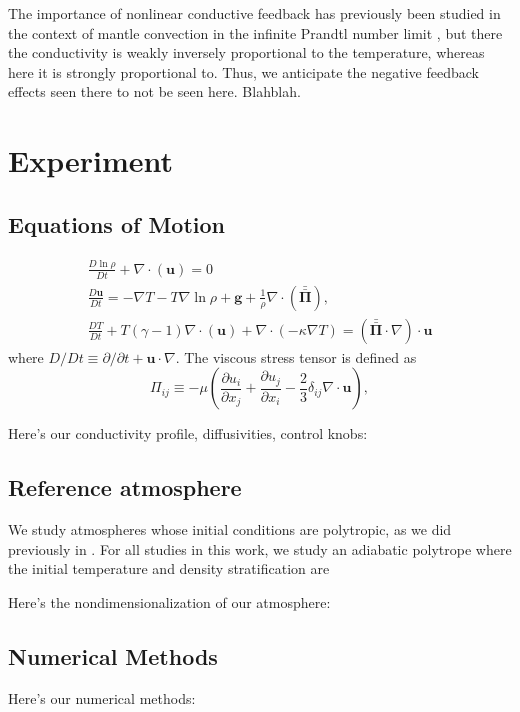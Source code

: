 \documentclass[twocolumn, amsmath, amsfonts, amssymb]{aastex62}
\newcommand{\Div}[1]{\ensuremath{\nabla\cdot\left( #1\right)}}
\newcommand{\grad}{\ensuremath{\nabla}}
\newcommand{\stressT}{\ensuremath{\bm{\bar{\bar{\Pi}}}}}
\begin{document}
The importance of nonlinear conductive feedback has previously been studied in
the context of mantle convection in the infinite Prandtl number limit
\citep{dubuffet&all2000}, but there the conductivity is weakly inversely proportional
to the temperature, whereas here it is strongly proportional to. Thus, we anticipate
the negative feedback effects seen there to not be seen here. Blahblah.





\section{Experiment} \label{sec:experiment}
\subsection{Equations of Motion}
\begin{gather}
\frac{D \ln\rho}{D t} + \Div{\bm{u}} = 0
	\label{eqn:density_equation}
\\
\frac{D \bm{u}}{D t}  =
-\grad T - T \grad\ln\rho + \bm{g} + \frac{1}{\rho}\Div{\stressT}, 
	\label{eqn:momentum_equation}
\\
\frac{D T}{D t} + T(\gamma - 1)\Div{\bm{u}}
+ \Div{-\kappa \grad T} = (\stressT\cdot\grad)\cdot\bm{u}
	\label{eqn:energy_equation}
\end{gather}
where $D/Dt \equiv \partial/\partial t + \bm{u}\cdot\grad$. The
viscous stress tensor is defined as 
\begin{equation}
\Pi_{ij} \equiv -\mu \left(\frac{\partial u_i}{\partial x_j} + 
\frac{\partial u_j}{\partial x_i} - \frac{2}{3}\delta_{ij}\grad\cdot\bm{u}\right),
	\label{eqn:stress_tensor}
\end{equation}


Here's our conductivity profile, diffusivities, control knobs:

\subsection{Reference atmosphere}
We study atmospheres whose initial conditions are polytropic,
as we did previously in \cite{anders&brown2017}. For all studies
in this work, we study an adiabatic polytrope where the initial
temperature and density stratification are


Here's the nondimensionalization of our atmosphere:


\subsection{Numerical Methods}
Here's our numerical methods:
\end{document}
